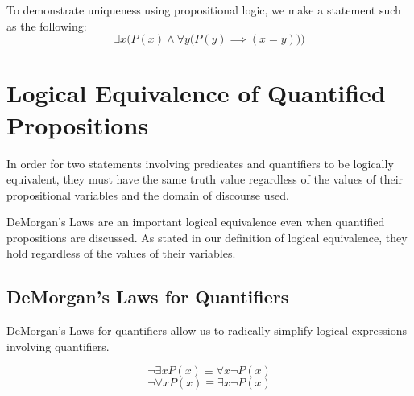 To demonstrate uniqueness using propositional logic, we make a statement such as the following:
\[ \exists x \Big( P(x) \land \forall y \big( P(y) \implies (x=y)\big)\Big) \]

\section{Logical Equivalence of Quantified Propositions}

In order for two statements involving predicates and quantifiers to be logically equivalent,
they must have the same truth value regardless of the values of their propositional variables
and the domain of discourse used.

DeMorgan's Laws are an important logical equivalence even when quantified propositions are discussed.
As stated in our definition of logical equivalence, they hold regardless of the values of their variables.

%
%

\subsection{DeMorgan's Laws for Quantifiers}

DeMorgan's Laws for quantifiers allow us to radically simplify logical expressions involving quantifiers.

\begin{equation}
  \neg \exists x P(x) \equiv \forall x \neg P(x)
  \label{eq:dmq1}
\end{equation}
\begin{equation}
  \neg \forall x P(x) \equiv \exists x \neg P(x)
  \label{eq:dmq2}
\end{equation}

